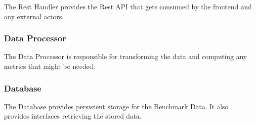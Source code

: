 The Rest Handler provides the Rest API that gets consumed by the frontend and any external actors.

\subsubsection*{Data Processor}

The Data Processor is responsible for transforming the data and computing any metrics that might be needed.

\subsubsection*{Database}

The Database provides persistent storage for the Benchmark Data. It also provides interfaces retrieving the stored data.
